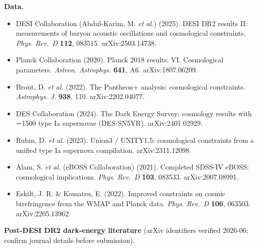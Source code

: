 \documentclass[
  10pt,
]{article}
\providecommand{\tightlist}{%
  \setlength{\itemsep}{0pt}\setlength{\parskip}{0pt}}
\begin{document}
\textbf{Data.}

\begin{itemize}
\tightlist
\item
  DESI Collaboration (Abdul-Karim, M. \emph{et al.}) (2025). DESI DR2
  results II: measurements of baryon acoustic oscillations and
  cosmological constraints. \emph{Phys. Rev.~D} \textbf{112}, 083515.
  arXiv:2503.14738.
\item
  Planck Collaboration (2020). Planck 2018 results. VI. Cosmological
  parameters. \emph{Astron. Astrophys.} \textbf{641}, A6.
  arXiv:1807.06209.
\item
  Brout, D. \emph{et al.} (2022). The Pantheon+ analysis: cosmological
  constraints. \emph{Astrophys. J.} \textbf{938}, 110. arXiv:2202.04077.
\item
  DES Collaboration (2024). The Dark Energy Survey: cosmology results
  with ∼1500 type Ia supernovae (DES-SN5YR). arXiv:2401.02929.
\item
  Rubin, D. \emph{et al.} (2023). Union3 / UNITY1.5: cosmological
  constraints from a unified type Ia supernova compilation.
  arXiv:2311.12098.
\item
  Alam, S. \emph{et al.} (eBOSS Collaboration) (2021). Completed SDSS-IV
  eBOSS: cosmological implications. \emph{Phys. Rev.~D} \textbf{103},
  083533. arXiv:2007.08991.
\item
  Eskilt, J. R. \& Komatsu, E. (2022). Improved constraints on cosmic
  birefringence from the WMAP and Planck data. \emph{Phys. Rev.~D}
  \textbf{106}, 063503. arXiv:2205.13962.
\end{itemize}

\textbf{Post-DESI DR2 dark-energy literature} (arXiv identifiers
verified 2026-06; confirm journal details before submission).
\end{document}
